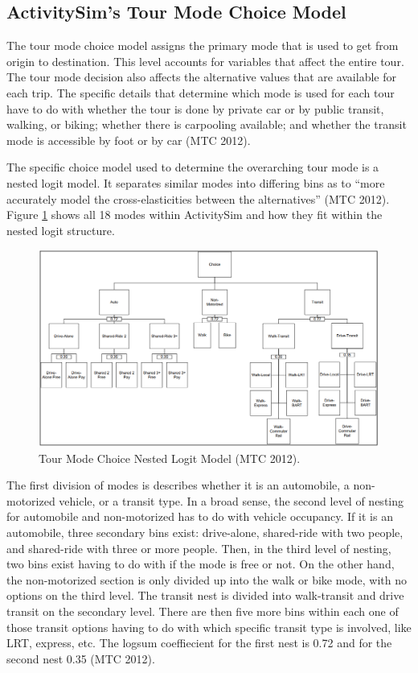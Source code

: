 \documentclass[12pt, oneside, openright]{byuthesis}
\begin{document}
\hypertarget{lit41}{%
\subsection{ActivitySim's Tour Mode Choice Model}\label{lit41}}

The tour mode choice model assigns the primary mode that is used to get from origin to destination. This level accounts for variables that affect the entire tour. The tour mode decision also affects the alternative values that are available for each trip. The specific details that determine which mode is used for each tour have to do with whether the tour is done by private car or by public transit, walking, or biking; whether there is carpooling available; and whether the transit mode is accessible by foot or by car (MTC 2012).

The specific choice model used to determine the overarching tour mode is a nested logit model. It separates similar modes into differing bins as to ``more accurately model the cross-elasticities between the alternatives'' (MTC 2012). Figure \ref{fig:fig1} shows all 18 modes within ActivitySim and how they fit within the nested logit structure.

\begin{figure}

{\centering \includegraphics[width=1\linewidth]{pics/tour_nest} 

}

\caption{Tour Mode Choice Nested Logit Model (MTC 2012).}\label{fig:fig1}
\end{figure}

The first division of modes is describes whether it is an automobile, a non-motorized vehicle, or a transit type. In a broad sense, the second level of nesting for automobile and non-motorized has to do with vehicle occupancy. If it is an automobile, three secondary bins exist: drive-alone, shared-ride with two people, and shared-ride with three or more people. Then, in the third level of nesting, two bins exist having to do with if the mode is free or not. On the other hand, the non-motorized section is only divided up into the walk or bike mode, with no options on the third level. The transit nest is divided into walk-transit and drive transit on the secondary level. There are then five more bins within each one of those transit options having to do with which specific transit type is involved, like LRT, express, etc. The logsum coeffiecient for the first nest is 0.72 and for the second nest 0.35 (MTC 2012).
\end{document}
